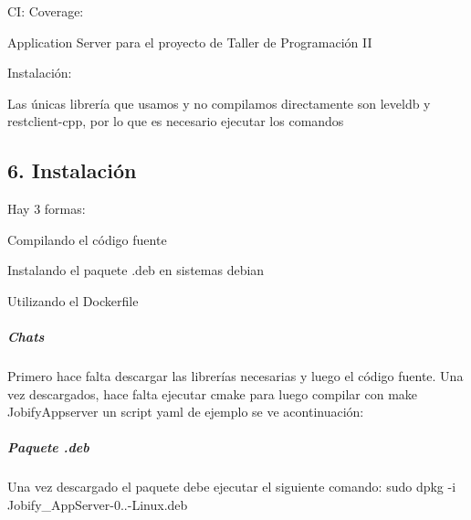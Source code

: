 CI\+: \href{https://travis-ci.org/alelevinas/Jobify_AppServer}{\tt } Coverage\+: \href{https://coveralls.io/github/alelevinas/Jobify_AppServer?branch=master}{\tt }

Application Server para el proyecto de Taller de Programación II

Instalación\+:

Las únicas librería que usamos y no compilamos directamente son leveldb y restclient-\/cpp, por lo que es necesario ejecutar los comandos

\subsection*{6. Instalación}

Hay 3 formas\+:
\begin{DoxyItemize}
\item Compilando el código fuente
\item Instalando el paquete {\ttfamily .deb} en sistemas debian
\item Utilizando el {\ttfamily Dockerfile}
\end{DoxyItemize}

\subparagraph*{Chats}

Primero hace falta descargar las librerías necesarias y luego el código fuente. Una vez descargados, hace falta ejecutar {\ttfamily cmake} para luego compilar con {\ttfamily make Jobify\+Appserver} un script {\ttfamily yaml} de ejemplo se ve acontinuación\+: 


\subparagraph*{Paquete {\ttfamily .deb}}

Una vez descargado el paquete debe ejecutar el siguiente comando\+: {\ttfamily sudo dpkg -\/i Jobify\+\_\+\+App\+Server-\/0..-\/\+Linux.\+deb}

